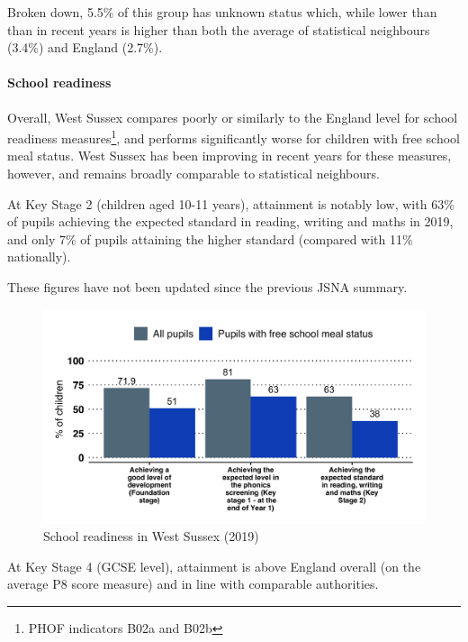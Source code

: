 Broken down, 5.5\% of this group has unknown status which, while lower than than in recent years is higher than both the average of statistical neighbours (3.4\%) and England (2.7\%). 


\paragraph{School readiness} Overall, West Sussex compares poorly or similarly to the England level for school readiness measures\footnote{PHOF indicators B02a and B02b}, and performs significantly worse for children with free school meal status. West Sussex has been improving in recent years for these measures, however, and remains broadly comparable to statistical neighbours.

At Key Stage 2 (children aged 10-11 years), attainment is notably low, with 63\% of pupils achieving the expected standard in reading, writing and maths in 2019, and only 7\% of pupils attaining the higher standard (compared with 11\% nationally).

These figures have not been updated since the previous JSNA summary.

\begin{figure}[htp]
    \centering
    \caption{School readiness in West Sussex (2019)}
    \includegraphics[width = \linewidth]{images/02_school_readiness_2019.png}
\end{figure}

At Key Stage 4 (GCSE level), attainment is above England overall (on the average P8 score measure) and in line with comparable authorities.

